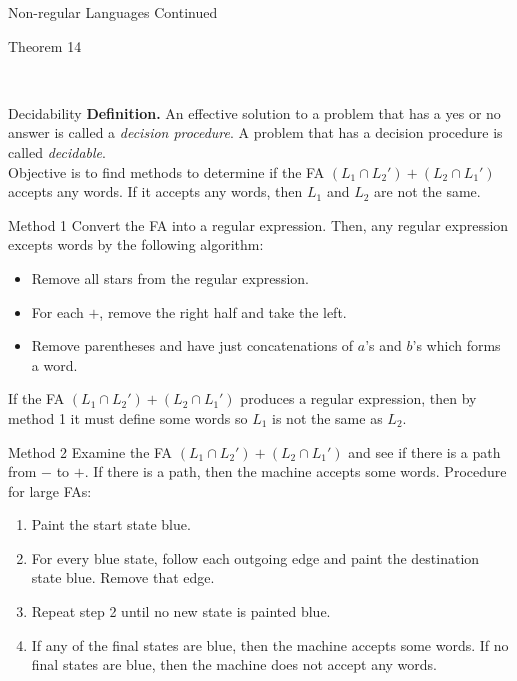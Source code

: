 \documentclass{article}
\begin{document}
\begin{multicols*}{3}
\begin{blackbox}{Non-regular Languages Continued}
\begin{brownbox}{Theorem 14}
    \end{brownbox}\\[-1ex]
\end{blackbox}
\begin{blackbox}{Decidability}
    \textbf{Definition.} An effective solution to a problem that has a yes or no answer is called a \emph{decision procedure}. A problem that has a decision procedure is called \emph{decidable}.\\
    Objective is to find methods to determine if the FA $(L_1 \cap L_2') + (L_2 \cap L_1')$ accepts any words. If it accepts any words, then $L_1$ and $L_2$ are not the same.\\
    \begin{pinkbox}{Method 1}
        Convert the FA into a regular expression. Then, any regular expression excepts words by the following algorithm:
        \begin{itemize}[leftmargin=5pt]
            \item Remove all stars from the regular expression.
            \item For each $+$, remove the right half and take the left.
            \item Remove parentheses and have just concatenations of $a$'s and $b$'s which forms a word.
        \end{itemize}
        If the FA $(L_1 \cap L_2') + (L_2 \cap L_1')$ produces a regular expression, then by method 1 it must define some words so $L_1$ is not the same as $L_2$.
    \end{pinkbox}
    \begin{redbox}{Method 2}
        Examine the FA $(L_1 \cap L_2') + (L_2 \cap L_1')$ and see if there is a path from $-$ to $+$. If there is a path, then the machine accepts some words. Procedure for large FAs: 
        \begin{enumerate}[leftmargin=5pt]
            \item Paint the start state blue.
            \item For every blue state, follow each outgoing edge and paint the destination state blue. Remove that edge.
            \item Repeat step 2 until no new state is painted blue. 
            \item If any of the final states are blue, then the machine accepts some words. If no final states are blue, then the machine does not accept any words.
        \end{enumerate}
    \end{redbox}

\end{blackbox}
\end{multicols*}
\end{document}
